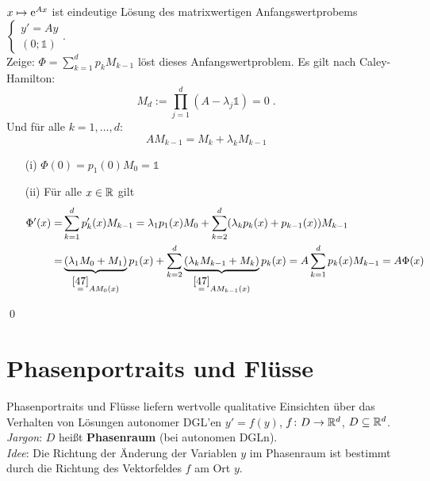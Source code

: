 \documentclass[a4paper]{article}
\begin{document}
\begin{Beweis}
$x\mapsto \mathrm{e}^{Ax}$ ist eindeutige Lösung des matrixwertigen Anfangswertprobems $\left\{\begin{array}{c}
y'=Ay\\
(0;\mathds1)
\end{array}\right.$.\\
Zeige: $\Phi=\sum_{k=1}^dp_kM_{k-1}$ löst dieses Anfangswertproblem. Es gilt  nach Caley-Hamilton:
\[M_d:=\prod_{j=1}^d(A-\lambda_j\mathds1)=0\;.\]
Und für alle $k=1,\ldots,d$:
\[AM_{k-1}=M_k+\lambda_kM_{k-1}\tag{$*$}\label{47}\]
\begin{itemize}
\item[(i)]$\Phi(0)=p_1(0)M_0=\mathds1$
\item[(ii)] Für alle $x\in\mathbb R$ gilt
\begin{align*}
\Phi'(x)=&\sum_{k=1}^dp_k'(x)M_{k-1}=\lambda_1p_1(x)M_0+\sum_{k=2}^d(\lambda_kp_k(x)+p_{k-1}(x))M_{k-1}\\
=&\underbrace{(\lambda_1M_0+M_1)}_{\overset{\eqref{47}}{=}AM_0(x)}p_1(x)+\sum_{k=2}^d\underbrace{(\lambda_kM_{k-1}+M_k)}_{\overset{\eqref{47}}{=}AM_{k-1}(x)}p_k(x)
=A\sum_{k=1}^dp_k(x)M_{k-1}=A\Phi(x)
\end{align*}
\end{itemize}\qed
\end{Beweis}

\section{Phasenportraits und Flüsse}
Phasenportraits und Flüsse liefern wertvolle qualitative Einsichten über das Verhalten von Lösungen autonomer DGL'en $y'=f(y)$, $f\colon D\to\mathbb R^d$, $D\subseteq \mathbb R^d$.\\
\textit{Jargon}: $D$ heißt \textbf{Phasenraum} (bei autonomen DGLn).\\
\textit{Idee}: Die Richtung der Änderung der Variablen $y$ im Phasenraum ist bestimmt durch die Richtung des Vektorfeldes $f$ am Ort $y$.
\end{document}
